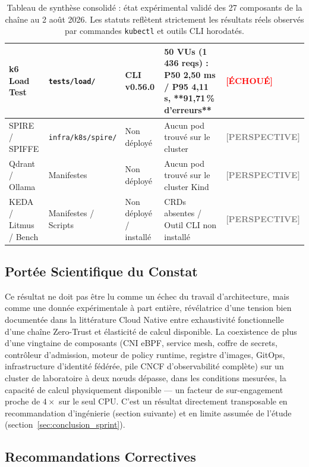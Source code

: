 \begin{table}[H]
\begin{tabular}{@{}p{2.6cm}p{2.2cm}p{2.2cm}p{4.8cm}p{2.0cm}@{}}
k6 Load Test & \texttt{tests/load/} & CLI v0.56.0 & 50 VUs (1\,436 reqs) : P50 2,50 ms / P95 4,11 s, **91,71\,\% d'erreurs** & \textcolor{red}{\textbf{[ÉCHOUÉ]}} \\
\midrule
SPIRE / SPIFFE & \texttt{infra/k8s/spire/} & Non déployé & Aucun pod trouvé sur le cluster & \textcolor{gray}{\textbf{[PERSPECTIVE]}} \\
Qdrant / Ollama & Manifestes & Non déployé & Aucun pod trouvé sur le cluster Kind & \textcolor{gray}{\textbf{[PERSPECTIVE]}} \\
KEDA / Litmus / Bench & Manifestes / Scripts & Non déployé / installé & CRDs absentes / Outil CLI non installé & \textcolor{gray}{\textbf{[PERSPECTIVE]}} \\
\bottomrule
\end{tabular}
\caption{Tableau de synthèse consolidé : état expérimental validé des 27 composants de la chaîne au 2 août 2026. Les statuts reflètent strictement les résultats réels observés par commandes \texttt{kubectl} et outils CLI horodatés.}
\label{tab:etat_execution_consolide}
\end{table}

\subsection{Portée Scientifique du Constat}

Ce résultat ne doit pas être lu comme un échec du travail d'architecture, mais comme une donnée expérimentale à part entière, révélatrice d'une tension bien documentée dans la littérature Cloud Native entre exhaustivité fonctionnelle d'une chaîne Zero-Trust et élasticité de calcul disponible. La coexistence de plus d'une vingtaine de composants (CNI eBPF, service mesh, coffre de secrets, contrôleur d'admission, moteur de policy runtime, registre d'images, GitOps, infrastructure d'identité fédérée, pile CNCF d'observabilité complète) sur un cluster de laboratoire à deux nœuds dépasse, dans les conditions mesurées, la capacité de calcul physiquement disponible — un facteur de sur-engagement proche de $4\times$ sur le seul CPU. C'est un résultat directement transposable en recommandation d'ingénierie (section suivante) et en limite assumée de l'étude (section~\ref{sec:conclusion_sprint}).

\subsection{Recommandations Correctives}

